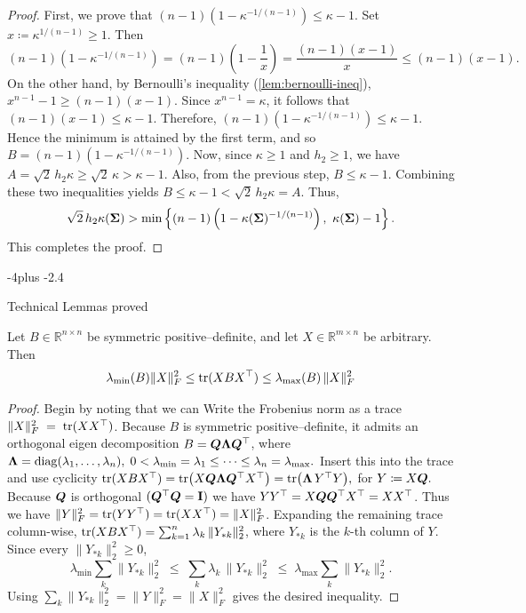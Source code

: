 \documentclass[numsec,webpdf,modern,medium,namedate]{oup-authoring-template}
\makeatletter
\theoremstyle{thmstyleone}%
\theoremstyle{thmstyletwo}%
\theoremstyle{thmstylethree}%
\def\subsection{%
  \@startsection{subsection}{2}{\z@}
  {-4\p@ plus -2\p@}{\if@traditional.4\p@\else2\p@\fi}
  {\reset@font\raggedright\subsecsize}}
\makeatother
\begin{document}
\begin{proof}
First, we prove that $(n-1)\left(1-\kappa^{-1/(n-1)}\right) \leq \kappa-1$.  Set $x \coloneq \kappa^{1/(n-1)} \ge 1$. Then
\begin{equation}
(n-1)\left(1-\kappa^{-1/(n-1)}\right)
=
(n-1)\left(1-\frac{1}{x}\right)
=
\frac{(n-1)(x-1)}{x}
\le
(n-1)(x-1).
\end{equation}
On the other hand, by Bernoulli's inequality (\ref{lem:bernoulli-ineq}), $x^{n-1}-1 \ge (n-1)(x-1).$ Since $x^{n-1}=\kappa$, it follows that $
(n-1)(x-1) \le \kappa-1.$
Therefore, $(n-1)\left(1-\kappa^{-1/(n-1)}\right) \leq \kappa-1$. Hence the minimum is attained by the first term, and so $B = (n-1)\left(1-\kappa^{-1/(n-1)}\right)$. Now, since $\kappa \ge 1$ and $h_2 \ge 1$, we have $A = \sqrt{2}\, h_2 \kappa \ge \sqrt{2}\,\kappa > \kappa-1$. Also, from the previous step, $B \leq \kappa-1$. Combining these two inequalities yields $B \leq \kappa-1 < \sqrt{2}\, h_2 \kappa = A$. Thus,
\begin{equation*}
\sqrt{2}\, h_2 \kappa(\bSig)
>
\min \left\{ (n-1)\left(1-\kappa(\bSig)^{-1/(n-1)}\right), \ \kappa(\bSig)-1 \right\}.
\end{equation*}
This completes the proof.
\end{proof}

\subsection{Technical Lemmas proved}

\begin{lemma}\label{lem:matrix-trace-bound}
Let $B\in\mathbb R^{n\times n}$ be symmetric positive–definite, and
let $X\in\mathbb R^{m\times n}$ be arbitrary.  Then
$$
  \lambda_{\min}(B)\lVert X\rVert_F^{2} \leq \mathrm{tr}(XBX^{\top}) \leq
  \lambda_{\max}(B)\,\lVert X\rVert_F^{2}
$$
\end{lemma}

\begin{proof}
Begin by noting that we can Write the Frobenius norm as a trace $\lVert X\rVert_F^{2}\;=\;\mathrm{tr}(XX^{\top})$. Because $B$ is symmetric positive–definite, it admits an orthogonal eigen decomposition $B = \boldsymbol{Q}\boldsymbol{\Lambda} \boldsymbol{Q}^{\top}$, where $\boldsymbol{\Lambda}=\operatorname{diag}(\lambda_1,\dots,\lambda_n),\;
0<\lambda_{\min}=\lambda_1\le\cdots\le\lambda_n=\lambda_{\max}.$ Insert this into the trace and use cyclicity $\mathrm{tr}(XBX^{\top})
  =\mathrm{tr}\bigl(X\boldsymbol{Q}\boldsymbol{\Lambda} \boldsymbol{Q}^{\top}X^{\top}\bigr)
  =\mathrm{tr}\bigl(\boldsymbol{\Lambda}\,Y^{\top}Y\bigr),$ for $Y\coloneqq X\boldsymbol{Q}.$ Because $\boldsymbol{Q}$ is orthogonal $(\boldsymbol{Q}^{\top}\boldsymbol{Q}=\mathbf{I})$ we have $YY^{\top}=X\boldsymbol{Q} \boldsymbol{Q}^{\top}X^{\top}=XX^{\top}$. Thus we have $\lVert Y\rVert_F^{2}=\mathrm{tr}(YY^{\top})=\mathrm{tr}(XX^{\top})=\lVert X\rVert_F^{2}$. Expanding the remaining trace column-wise, $\mathrm{tr}(XBX^{\top})=\sum_{k=1}^{n}\lambda_k\,\lVert Y_{*k}\rVert_2^{2}$,
where $Y_{*k}$ is the $k$-th column of $Y$.  Since every
$\lVert Y_{*k}\rVert_2^{2}\ge 0$,
\[
\lambda_{\min}\sum_{k}\lVert Y_{*k}\rVert_2^{2}
  \;\le\;
  \sum_{k}\lambda_k\,\lVert Y_{*k}\rVert_2^{2}
  \;\le\;
  \lambda_{\max}\sum_{k}\lVert Y_{*k}\rVert_2^{2}.
\]
Using $\sum_{k}\lVert Y_{*k}\rVert_2^{2}=\lVert Y\rVert_F^{2}=\lVert X\rVert_F^{2}$
gives the desired inequality.
\end{proof}
\end{document}
